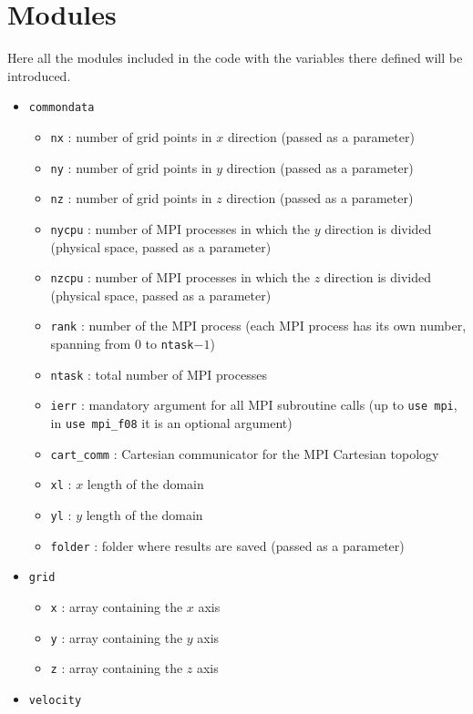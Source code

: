 \section{Modules}
Here all the modules included in the code with the variables there defined will be introduced.
\begin{itemize}
\item \texttt{commondata}
\begin{itemize}
\item \texttt{nx} : number of grid points in $x$ direction (passed as a parameter)
\item \texttt{ny} : number of grid points in $y$ direction (passed as a parameter)
\item \texttt{nz} : number of grid points in $z$ direction (passed as a parameter)
\item \texttt{nycpu} : number of MPI processes in which the $y$ direction is divided (physical space, passed as a parameter)
\item \texttt{nzcpu} : number of MPI processes in which the $z$ direction is divided (physical space, passed as a parameter)
\item \texttt{rank} : number of the MPI process (each MPI process has its own number, spanning from 0 to \texttt{ntask}$-1$)
\item \texttt{ntask} : total number of MPI processes
\item \texttt{ierr} : mandatory argument for all MPI subroutine calls (up to \texttt{use mpi}, in \texttt{use mpi\_f08} it is an optional argument)
\item \texttt{cart\_comm} : Cartesian communicator for the MPI Cartesian topology
\item \texttt{xl} : $x$ length of the domain
\item \texttt{yl} : $y$ length of the domain
\item \texttt{folder} : folder where results are saved (passed as a parameter)
\end{itemize}
\item \texttt{grid}
\begin{itemize}
\item \texttt{x} : array containing the $x$ axis
\item \texttt{y} : array containing the $y$ axis
\item \texttt{z} : array containing the $z$ axis
\end{itemize}
\item \texttt{velocity}
\begin{itemize}

\end{itemize}
\end{itemize}
